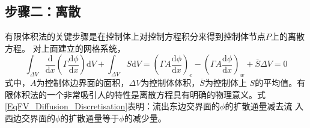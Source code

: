 \subsection{步骤二：离散}
有限体积法的关键步骤是在控制体上对控制方程积分来得到控制体节点$P$上的离散方程。
对上面建立的网格系统，
\begin{equation}
  \int_{\Delta V}\!
  \frac{\mathrm{d} }{\mathrm{d} x}
  \left(
    \Gamma \frac{\mathrm{d} \phi}{\mathrm{d} x}
  \right)
  \mathrm{d}V
  +
  \int_{\Delta V}\!
  S
  \mathrm{d}V
  =
  \left(
    \Gamma A\frac{\mathrm{d} \phi}{\mathrm{d} x}
  \right)_{e}
  -
  \left(
    \Gamma A\frac{\mathrm{d} \phi}{\mathrm{d} x}
  \right)_{w}
  +
  \overline{S}\Delta V
  =
  0
  \label{EqFV_Diffusion_Discretisation}
\end{equation}
式中，$A$为控制体边界面的面积，$\Delta V$为控制体体积，$\overline{S}$为控制体上
$S$的平均值。有限体积法的一个非常吸引人的特性是离散方程具有明确的物理意义。式
\eqref{EqFV_Diffusion_Discretisation}表明：流出东边交界面的$\phi$的扩散通量减去流
入西边交界面的$\phi$的扩散通量等于$\phi$的减少量。


